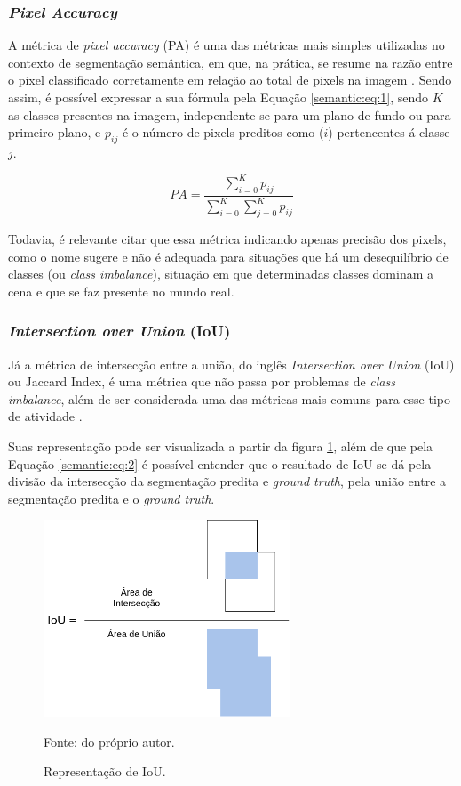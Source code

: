 \subsubsection{\textit{Pixel Accuracy}}
\label{semantic:pa}

A métrica de \textit{pixel accuracy} (PA) é uma das métricas mais simples utilizadas no contexto de segmentação semântica, em que, na prática, se resume na razão entre o pixel classificado corretamente em relação ao total de pixels na imagem \cite{Minaee2021}. Sendo assim, é possível expressar a sua fórmula pela Equação \ref{semantic:eq:1}, sendo $K$ as classes presentes na imagem, independente se para um plano de fundo ou para primeiro plano, e $p_{ij}$ é o número de pixels preditos como ($i$) pertencentes á classe $j$.

\begin{equation}
    \label{semantic:eq:1}
    PA = \frac{\sum_{i=0}^{K} p_{ij}}{\sum_{i=0}^{K} \sum_{j=0}^{K} p_{ij}}
\end{equation}

Todavia, é relevante citar que essa métrica indicando apenas precisão dos pixels, como o nome sugere e não é adequada para situações que há um desequilíbrio de classes (ou \textit{class imbalance}), situação em que determinadas classes dominam a cena e que se faz presente no mundo real.


\subsubsection{\textit{Intersection over Union} (IoU)}
\label{semantic:IoU}

Já a métrica de intersecção entre a união, do inglês \textit{Intersection over Union} (IoU) ou Jaccard Index, é uma métrica que não passa por problemas de \textit{class imbalance}, além de ser considerada uma das métricas mais comuns para esse tipo de atividade \cite{Minaee2021}.

Suas representação pode ser visualizada a partir da figura \ref{semantic:fig:1}, além de que pela Equação \ref{semantic:eq:2} é possível entender que o resultado de IoU se dá pela divisão da intersecção da segmentação predita e \textit{ground truth}, pela união entre a segmentação predita e o \textit{ground truth}.

\begin{figure}[H]
    \centering
    \caption{Representação de IoU.}
    \includegraphics[height=2.3in]{recursos/imagens/semantic/IoU.png}
    \label{semantic:fig:1}

    \vspace*{1 cm}
    Fonte: do próprio autor.
\end{figure}

